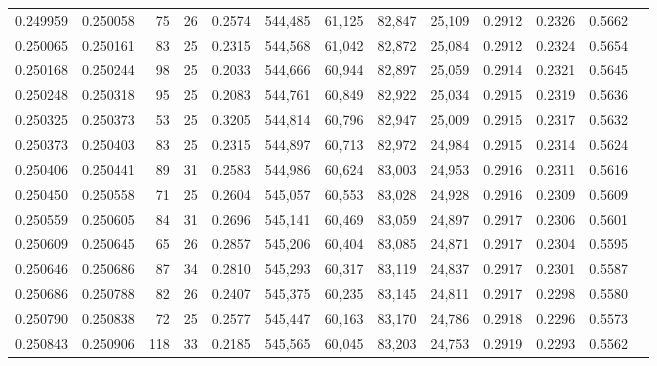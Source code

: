 \begin{tabular}{rrrrrrrrrrrrr}
0.249959 & 0.250058 &  75 &  26 &                                     0.2574 & 544,485 &  61,125 &  82,847 &  25,109 & 0.2912 & 0.2326 & 0.5662 \\
0.250065 & 0.250161 &  83 &  25 &                                     0.2315 & 544,568 &  61,042 &  82,872 &  25,084 & 0.2912 & 0.2324 & 0.5654 \\
0.250168 & 0.250244 &  98 &  25 &                                     0.2033 & 544,666 &  60,944 &  82,897 &  25,059 & 0.2914 & 0.2321 & 0.5645 \\
0.250248 & 0.250318 &  95 &  25 &                                     0.2083 & 544,761 &  60,849 &  82,922 &  25,034 & 0.2915 & 0.2319 & 0.5636 \\
0.250325 & 0.250373 &  53 &  25 &                                     0.3205 & 544,814 &  60,796 &  82,947 &  25,009 & 0.2915 & 0.2317 & 0.5632 \\
0.250373 & 0.250403 &  83 &  25 &                                     0.2315 & 544,897 &  60,713 &  82,972 &  24,984 & 0.2915 & 0.2314 & 0.5624 \\
0.250406 & 0.250441 &  89 &  31 &                                     0.2583 & 544,986 &  60,624 &  83,003 &  24,953 & 0.2916 & 0.2311 & 0.5616 \\
0.250450 & 0.250558 &  71 &  25 &                                     0.2604 & 545,057 &  60,553 &  83,028 &  24,928 & 0.2916 & 0.2309 & 0.5609 \\
0.250559 & 0.250605 &  84 &  31 &                                     0.2696 & 545,141 &  60,469 &  83,059 &  24,897 & 0.2917 & 0.2306 & 0.5601 \\
0.250609 & 0.250645 &  65 &  26 &                                     0.2857 & 545,206 &  60,404 &  83,085 &  24,871 & 0.2917 & 0.2304 & 0.5595 \\
0.250646 & 0.250686 &  87 &  34 &                                     0.2810 & 545,293 &  60,317 &  83,119 &  24,837 & 0.2917 & 0.2301 & 0.5587 \\
0.250686 & 0.250788 &  82 &  26 &                                     0.2407 & 545,375 &  60,235 &  83,145 &  24,811 & 0.2917 & 0.2298 & 0.5580 \\
0.250790 & 0.250838 &  72 &  25 &                                     0.2577 & 545,447 &  60,163 &  83,170 &  24,786 & 0.2918 & 0.2296 & 0.5573 \\
0.250843 & 0.250906 & 118 &  33 &                                     0.2185 & 545,565 &  60,045 &  83,203 &  24,753 & 0.2919 & 0.2293 & 0.5562 \\

\end{tabular}
